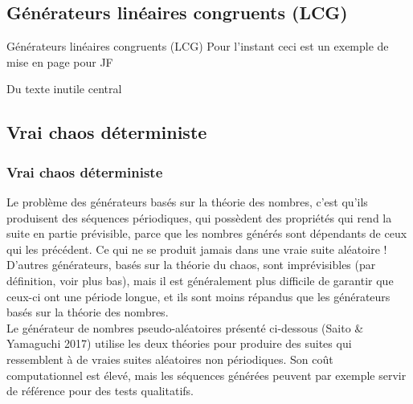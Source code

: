 \documentclass{beamer}
\newcommand\subminitoc{
  \begin{frame}{\secname}
    \tableofcontents[currentsubsection, hideothersubsections,
    sectionstyle=show/shaded, subsectionstyle=show/shaded, subsubsectionstyle=show]
  \end{frame}
}
\begin{document}
\subsection{Générateurs linéaires congruents (LCG)}
\begin{frame}{Générateurs linéaires congruents (LCG)}
  Pour l'instant ceci est un exemple de mise en page pour JF
  \begin{minipage}{0.32\textwidth}
  \end{minipage}
  \begin{minipage}{0.33\textwidth}
    Du texte inutile central
  \end{minipage}
  \begin{minipage}{0.32\textwidth}
  \end{minipage}
\end{frame}

\subsection{Vrai chaos déterministe}
\subminitoc
\begin{frame}
\frametitle{Vrai chaos déterministe}
Le problème des générateurs basés sur la théorie des nombres, c’est qu’ils produisent des séquences périodiques, qui possèdent des propriétés qui rend la suite en partie prévisible, parce que les nombres générés sont dépendants de ceux qui les précédent. Ce qui ne se produit jamais dans une vraie suite aléatoire ! \\
D’autres générateurs, basés sur la théorie du chaos, sont imprévisibles (par définition, voir plus bas), mais il est généralement plus difficile de garantir que ceux-ci ont une période longue, et ils sont moins répandus que les générateurs basés sur la théorie des nombres. \\
Le générateur de nombres pseudo-aléatoires présenté ci-dessous (Saito \& Yamaguchi 2017) utilise les deux théories pour produire des suites qui ressemblent à de vraies suites aléatoires non périodiques. Son coût computationnel est élevé, mais les séquences générées peuvent par exemple servir de référence pour des tests qualitatifs. 
\end{frame}
\end{document}
